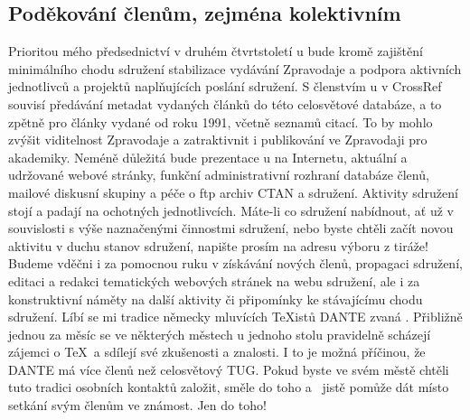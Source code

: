 \subsection*{Poděkování členům, zejména kolektivním}
Prioritou mého předsednictví v druhém čtvrtstoletí \CSTUG u bude kromě zajištění minimálního chodu sdružení stabilizace vydávání Zpravodaje a podpora aktivních jednotlivců a projektů naplňujících poslání sdružení.
S členstvím \CSTUG u v CrossRef souvisí předávání metadat vydaných článků do této celosvětové databáze, a to zpětně pro články vydané od roku 1991, včetně seznamů citací. To by mohlo zvýšit viditelnost Zpravodaje a zatraktivnit i publikování ve Zpravodaji pro akademiky.  Neméně důležitá bude prezentace \CSTUG u na Internetu, aktuální a udržované webové stránky, funkční administrativní rozhraní databáze členů, mailové diskusní skupiny a péče o ftp archiv CTAN a sdružení. 
Aktivity sdružení stojí a padají na ochotných jednotlivcích.  Máte-li co sdružení nabídnout, ať už v souvislosti s výše naznačenými činnostmi sdružení, nebo byste chtěli začít novou aktivitu v duchu stanov sdružení, napište prosím na adresu výboru z tiráže!
Budeme vděčni i za pomocnou ruku v získávání nových členů, propagaci sdružení, editaci a redakci tematických webových stránek na webu sdružení, ale i za konstruktivní náměty na další aktivity či připomínky ke stávajícímu chodu sdružení.
Líbí se mi tradice německy mluvících \TeX istů DANTE zvaná .  Přibližně jednou za měsíc se ve některých městech u jednoho stolu pravidelně scházejí zájemci o \TeX\ a sdílejí své zkušenosti a znalosti.  I to je možná příčinou, že DANTE má více členů než celosvětový TUG. Pokud byste ve svém městě chtěli tuto tradici osobních kontaktů založit, směle do toho a \CSTUG\ jistě pomůže dát místo setkání svým členům ve známost. Jen do toho! 
